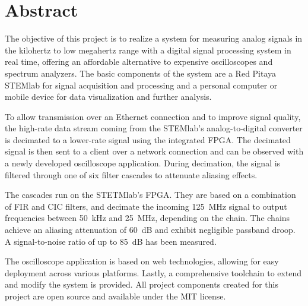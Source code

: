 %
%
\chapter*{Abstract} %
\label{ch:app:abstract}

The objective  of this  project is  to realize a  system for  measuring analog
signals  in  the kilohertz  to  low  megahertz  range  with a  digital  signal
processing  system  in  real  time,  offering  an  affordable  alternative  to
expensive oscilloscopes  and spectrum  analyzers. The basic components  of the
system are a  Red Pitaya STEMlab for signal acquisition  and processing  and a
personal  computer  or  mobile  device  for  data  visualization  and  further
analysis.

To  allow transmission  over  an  Ethernet connection  and  to improve  signal
quality, the high-rate data stream coming from the STEMlab's analog-to-digital
converter is decimated  to a lower-rate signal using  the integrated FPGA. The
decimated signal is then sent to a client over a network connection and can be
observed with a newly  developed oscilloscope application.  During decimation,
the  signal is  filtered  through  one of  six  filter  cascades to  attenuate
aliasing effects.

The cascades  run on the STETMlab's  FPGA. They are based on  a combination of
FIR  and CIC  filters,  and  decimate the  incoming  \SI{125}{\MHz} signal  to
output frequencies  between \SI{50}{\kHz} and \SI{25}{\MHz},  depending on the
chain. The chains achieve an aliasing  attenuation of \SI{60}{\dB} and exhibit
negligible passband droop. A  signal-to-noise ratio of up  to \SI{85}{\dB} has
been measured.

The oscilloscope application  is based on web technologies,  allowing for easy
deployment  across various  platforms. Lastly,  a  comprehensive toolchain  to
extend and modify  the system is provided. All project  components created for
this project are open source and available under the MIT license.



